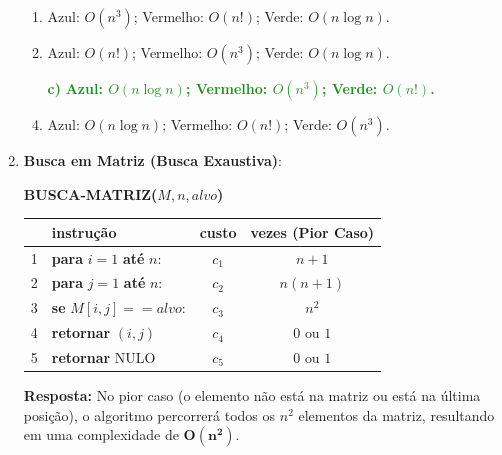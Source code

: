 \documentclass[12pt]{article}
\newcommand{\quadro}[1]{\vspace{0.2cm}\begin{tcolorbox}[colback=green!5, colframe=forestgreen, boxrule=0.5pt, arc=0pt] \textbf{Resposta:} #1 \end{tcolorbox}}
\begin{document}
\begin{enumerate}[label=\arabic*), leftmargin=1.5cm, itemsep=0.8cm]
\begin{center}
    \end{center}
    
    \begin{enumerate}[label=\alph*)]
        \item Azul: $O(n^3)$; Vermelho: $O(n!)$; Verde: $O(n \log n)$.
        \item Azul: $O(n!)$; Vermelho: $O(n^3)$; Verde: $O(n \log n)$.
        \item[\textcolor{forestgreen}{\textbf{c)}}] \textcolor{forestgreen}{\textbf{Azul: $O(n \log n)$; Vermelho: $O(n^3)$; Verde: $O(n!)$.}}
        \item Azul: $O(n \log n)$; Vermelho: $O(n!)$; Verde: $O(n^3)$.
    \end{enumerate}

    \item \textbf{Busca em Matriz (Busca Exaustiva)}: 
    \begin{tcolorbox}[colback=white, colframe=black, fontupper=\small]
        \textbf{BUSCA-MATRIZ($M, n, alvo$)} \\
        \begin{tabular}{llcc}
            \hline
            & \textbf{instrução} & \textbf{custo} & \textbf{vezes} (Pior Caso) \\
            \hline
            1 & \textbf{para} $i = 1$ \textbf{até} $n$: & $c_1$ & $n+1$ \\
            2 & \quad \textbf{para} $j = 1$ \textbf{até} $n$: & $c_2$ & $n(n+1)$ \\
            3 & \quad \quad \textbf{se} $M[i,j] == alvo$: & $c_3$ & $n^2$ \\
            4 & \quad \quad \quad \textbf{retornar} $(i,j)$ & $c_4$ & $0 \text{ ou } 1$ \\
            5 & \textbf{retornar} NULO & $c_5$ & $0 \text{ ou } 1$ \\
            \hline
        \end{tabular}
    \end{tcolorbox}
    \quadro{No pior caso (o elemento não está na matriz ou está na última posição), o algoritmo percorrerá todos os $n^2$ elementos da matriz, resultando em uma complexidade de $\mathbf{O(n^2)}$.}


\end{enumerate}
\end{document}
